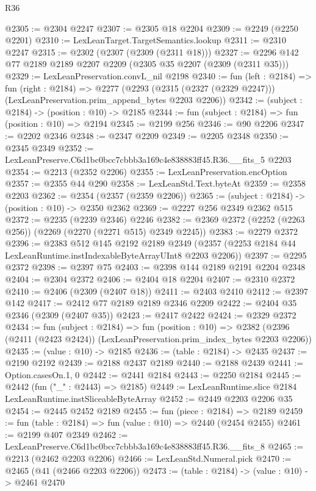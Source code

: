 \begin{lexlean}{R36}
\begin{coremodule}
@2305 := @2304 @2247
@2307 := @2305 @18 @2204
@2309 := @2249 (@2250 @2201)
@2310 := LexLeanTarget.TargetSemantics.lookup
@2311 := @2310 @2247
@2315 := @2302 (@2307 (@2309 (@2311 @18)))
@2327 := @2296 @142 @77 @2189 @2189 @2207 @2209 (@2305 @35 @2207 (@2309 (@2311 @35)))
@2329 := LexLeanPreservation.convL_nil @2198
@2340 := fun (left : @2184) =>
  fun (right : @2184) =>
  @2277 (@2293 (@2315 (@2327 (@2329 @2247))) (LexLeanPreservation.prim_append_bytes @2203 @2206))
@2342 := (subject : @2184) -> (position : @10) -> @2185
@2344 := fun (subject : @2184) => fun (position : @10) => @2194
@2345 := @2199 @256
@2346 := @90 @2206
@2347 := @2202 @2346
@2348 := @2347 @2209
@2349 := @2205 @2348
@2350 := @2345 @2349
@2352 := LexLeanPreserve.C6d1bc0bcc7cbbb3a169c4e838883ff45.R36.__fits_5 @2203
@2354 := @2213 (@2352 @2206)
@2355 := LexLeanPreservation.encOption
@2357 := @2355 @44 @290
@2358 := LexLeanStd.Text.byteAt
@2359 := @2358 @2203
@2362 := @2354 (@2357 (@2359 @2206))
@2365 := (subject : @2184) -> (position : @10) -> @2350 @2362
@2369 := @2227 @256 @2349 @2362 @515
@2372 := @2235 (@2239 @2346) @2246
@2382 := @2369 @2372 (@2252 (@2263 @256)) (@2269 (@2270 (@2271 @515) @2349 @2245))
@2383 := @2279 @2372
@2396 := @2383
    @512
    @145
    @2192
    @2189
    @2349
    (@2357 (@2253 @2184 @44 LexLeanRuntime.instIndexableByteArrayUInt8 @2203 @2206))
@2397 := @2295 @2372
@2398 := @2397 @75
@2403 := @2398 @144 @2189 @2191 @2204 @2348
@2404 := @2304 @2372
@2406 := @2404 @18 @2204
@2407 := @2310 @2372
@2410 := @2406 (@2309 (@2407 @18))
@2411 := @2403 @2410
@2412 := @2397 @142
@2417 := @2412 @77 @2189 @2189 @2346 @2209
@2422 := @2404 @35 @2346 (@2309 (@2407 @35))
@2423 := @2417 @2422
@2424 := @2329 @2372
@2434 := fun (subject : @2184) =>
  fun (position : @10) =>
  @2382 (@2396 (@2411 (@2423 @2424)) (LexLeanPreservation.prim_index_bytes @2203 @2206))
@2435 := (value : @10) -> @2185
@2436 := (table : @2184) -> @2435
@2437 := @2190 @2192
@2439 := @2188 @2437 @2189
@2440 := @2188 @2439
@2441 := Option.casesOn.{1, 0}
@2442 := @2441 @2184
@2443 := @2250 @2184
@2445 := @2442 (fun ("_" : @2443) => @2185)
@2449 := LexLeanRuntime.slice @2184 LexLeanRuntime.instSliceableByteArray
@2452 := @2449 @2203 @2206 @35
@2454 := @2445 @2452 @2189
@2455 := fun (piece : @2184) => @2189
@2459 := fun (table : @2184) => fun (value : @10) => @2440 (@2454 @2455)
@2461 := @2199 @407 @2349
@2462 := LexLeanPreserve.C6d1bc0bcc7cbbb3a169c4e838883ff45.R36.__fits_8
@2465 := @2213 (@2462 @2203 @2206)
@2466 := LexLeanStd.Numeral.pick
@2470 := @2465 (@41 (@2466 @2203 @2206))
@2473 := (table : @2184) -> (value : @10) -> @2461 @2470

\end{coremodule}
\end{lexlean}
